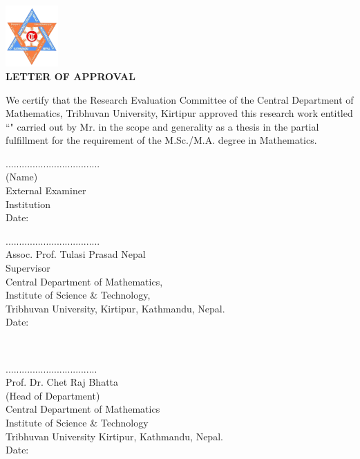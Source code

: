 
 \begin{center}
 	\includegraphics[width=0.15\textwidth]{pictures/tulogo.png}\\[1.5cm]
 {\Large{\bfseries{LETTER OF APPROVAL}}}\\[.5cm]
\end{center}

\noindent
We certify that the Research Evaluation Committee of the Central Department of Mathematics, Tribhuvan University, Kirtipur approved this research work entitled ``\textbf{\thetitle}" carried out by Mr. \textbf{\theauthor} in the scope and generality as a thesis in the partial fulfillment for the requirement of the M.Sc./M.A. degree in Mathematics.
\\[3.5cm]
\begin{minipage}{0.45\textwidth}
		...................................\\
		(Name) \\
		External Examiner\\
		Institution \\[0.1cm]
		Date:
\end{minipage}
%
\begin{minipage}{0.6\textwidth}
	...................................\\
		Assoc. Prof. Tulasi Prasad Nepal \\
		Supervisor \\
		Central Department of Mathematics,\\
                Institute of Science \& Technology,\\
                Tribhuvan University,
                Kirtipur, Kathmandu, Nepal.\\[0.1cm]
		Date: \thedate

\end{minipage}\\[3cm]

\begin{center}
..................................\\
Prof. Dr. Chet Raj Bhatta\\
	(Head of Department)\\
 Central Department of Mathematics\\
	 Institute of Science \& Technology\\
	 Tribhuvan University
	 Kirtipur, Kathmandu, Nepal.\\
	Date: \thedate
\end{center}
